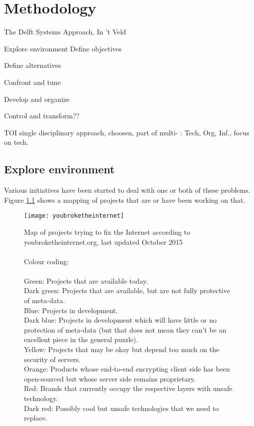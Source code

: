 \chapter{Methodology}


The Delft Systems Approach, In 't Veld


Explore environment
Define objectives

Define alternatives

Confront and tune

Develop and organize

Control and transform??


TOI single disciplinary approach, choosen, part of multi- : Tech, Org, Inf., focus on tech.


\section{Explore environment}

Various initiatives have been started to deal with one or both of these problems.
Figure \ref{fig:youbroketheinternet} shows a mapping of projects that are or have been working on that.
\\
\begin{figure}[h]
	\centering
	\texttt{[image: youbroketheinternet]}
	\caption{Map of projects trying to fix the Internet according to youbroketheinternet.org, last updated October 2015\\
		\\
		Colour coding:\\
		\\
		\textcolor[RGB]{51,204,51}{Green:} Projects that are available today.\\
		\textcolor[RGB]{86,149,38}{Dark green:} Projects that are available, but are not fully protective of meta-data.\\
		\textcolor[RGB]{89,204,255}{Blue:} Projects in development.\\
		\textcolor[RGB]{17,153,211}{Dark blue:} Projects in development which will have little or no protection of meta-data (but that does not mean they can't be an excellent piece in the general puzzle).\\
		\textcolor[RGB]{226,228,27}{Yellow:} Projects that may be okay but depend too much on the security of servers.\\
		\textcolor[RGB]{255,153,51}{Orange:} Products whose end-to-end encrypting client side has been open-sourced but whose server side remains proprietary.\\
		\textcolor[RGB]{225,77,93}{Red:} Brands that currently occupy the respective layers with unsafe technology.\\
		\textcolor[RGB]{155,35,25}{Dark red:} Possibly cool but unsafe technologies that we need to replace.}
	\label{fig:youbroketheinternet}
\end{figure}

